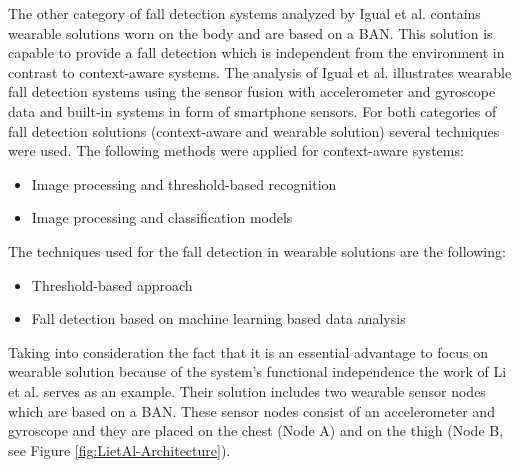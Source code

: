 \documentclass[10pt,journal,compsoc]{IEEEtran}
\begin{document}
The other category of fall detection systems analyzed by Igual et al. \cite{Igual2013} contains wearable solutions worn on the body and are based on a BAN. This solution is capable to provide a fall detection which is independent from the environment in contrast to context-aware systems. The analysis of Igual et al. \cite{Igual2013} illustrates wearable fall detection systems using the sensor fusion with accelerometer and gyroscope data and built-in systems in form of smartphone sensors. For both categories of fall detection solutions (context-aware and wearable solution) several techniques were used. The following methods were applied for context-aware systems:
\begin{itemize}
	\item Image processing and threshold-based recognition
	\item Image processing and classification models
\end{itemize} 
The techniques used for the fall detection in wearable solutions are the following:
\begin{itemize}
	\item Threshold-based approach
	\item Fall detection based on machine learning based data analysis
\end{itemize}
Taking into consideration the fact that it is an essential advantage to focus on wearable solution because of the system's functional independence the work of Li et al. \cite{Li2009} serves as an example. Their solution includes two wearable sensor nodes which are based on a BAN. These sensor nodes consist of an accelerometer and gyroscope and they are placed on the chest (Node A) and on the thigh (Node B, see Figure \ref{fig:LietAl-Architecture}). 
\end{document}
